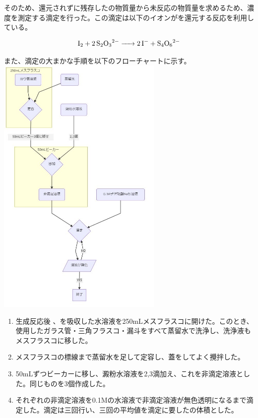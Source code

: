 \documentclass{ltjsarticle}
\begin{document}
そのため、還元されずに残存したの物質量から未反応の物質量を求めるため、濃度を測定する滴定を行った。この滴定は以下のイオンがを還元する反応を利用している。

\begin{equation}
    \ce{I2 + 2S2O3^{2-} -> 2I^- + S4O6^{2-}}
\end{equation}

また、滴定の大まかな手順を以下のフローチャートに示す。\\
\includegraphics[width=8cm]{ヨウ素滴定.jpg}

\begin{enumerate}
    \item {}生成反応後 、を吸収した水溶液を250mLメスフラスコに開けた。このとき、使用したガラス管・三角フラスコ・漏斗をすべて蒸留水で洗浄し、洗浄液もメスフラスコに移した。
    \item メスフラスコの標線まで蒸留水を足して定容し、蓋をしてよく攪拌した。
    \item 50mLずつビーカーに移し、澱粉水溶液を2,3滴加え、これを非滴定溶液とした。同じものを3個作成した。
    \item それぞれの非滴定溶液を0.1Mの水溶液で非滴定溶液が無色透明になるまで滴定した。滴定は三回行い、三回の平均値を滴定に要したの体積とした。
\end{enumerate}
\end{document}
